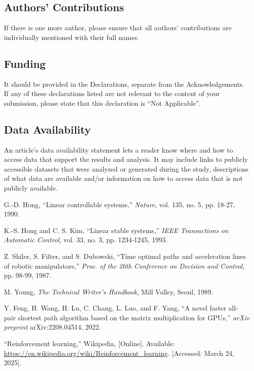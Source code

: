 \documentclass{IJCAS}
\begin{document}
\subsection*{Authors' Contributions}
If there is one more author, please ensure that all authors' contributions are individually mentioned with their full names.

\subsection*{Funding }
It should be provided in the Declarations, separate from the Acknowledgements. If any of these declarations listed are not relevant to the content of your submission, please state that this declaration is ``Not Applicable''.

\subsection*{Data Availability}
An article’s data availability statement lets a reader know where and how to access data that support the results and analysis. It may include links to publicly accessible datasets that were analyzed or generated during the study, descriptions of what data are available and/or information on how to access data that is not publicly available. 



\begin{reference}
 

 G.-D. Hong, ``Linear controllable systems,'' \textit{Nature}, vol. 135, no. 5, pp. 18-27, 1990. 

 K.-S. Hong and C. S. Kim, ``Linear stable systems,'' \textit{IEEE Transactions on Automatic Control}, vol. 33, no. 3, pp. 1234-1245, 1993. 

 Z. Shiler, S. Filter, and S. Dubowski, ``Time optimal paths and acceleration lines of robotic manipulators,'' \textit{Proc. of the 26th Conference on Decision and Control}, pp. 98-99, 1987.

  M. Young, \textit{The Technical Writer's Handbook}, Mill Valley, Seoul, 1989.

  Y. Feng, H. Wang, H. Lu, C. Chang, L. Luo, and F. Yang, ``A novel faster all-pair shortest path algorithm based on the matrix multiplication for GPUs,'' \textit{arXiv preprint} arXiv:2208.04514, 2022.

 ``Reinforcement learning,'' Wikipedia, [Online]. Available: \href{https://en.wikipedia.org/wiki/Reinforcement_learning}{https://en.wikipedia.org/wiki/Reinforcement\_learning}. [Accessed: March 24, 2025].
\end{reference}



\clearafterbiography
\relax 
\end{document}
